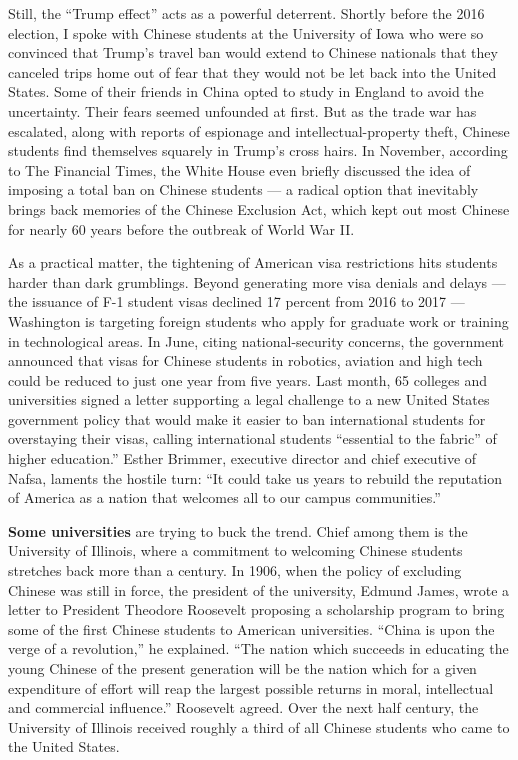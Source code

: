 Still, the ``Trump effect'' acts as a powerful deterrent. Shortly before
the 2016 election, I spoke with Chinese students at the University of
Iowa who were so convinced that Trump's travel ban would extend to
Chinese nationals that they canceled trips home out of fear that they
would not be let back into the United States. Some of their friends in
China opted to study in England to avoid the uncertainty. Their fears
seemed unfounded at first. But as the trade war has escalated, along
with reports of espionage and intellectual-property theft, Chinese
students find themselves squarely in Trump's cross hairs. In November,
according to The Financial Times, the White House even briefly discussed
the idea of imposing a total ban on Chinese students --- a radical
option that inevitably brings back memories of the Chinese Exclusion
Act, which kept out most Chinese for nearly 60 years before the outbreak
of World War II.

As a practical matter, the tightening of American visa restrictions hits
students harder than dark grumblings. Beyond generating more visa
denials and delays --- the issuance of F-1 student visas declined 17
percent from 2016 to 2017 --- Washington is targeting foreign students
who apply for graduate work or training in technological areas. In June,
citing national-security concerns, the government announced that visas
for Chinese students in robotics, aviation and high tech could be
reduced to just one year from five years. Last month, 65 colleges and
universities signed a letter supporting a legal challenge to a new
United States government policy that would make it easier to ban
international students for overstaying their visas, calling
international students ``essential to the fabric'' of higher
education.'' Esther Brimmer, executive director and chief executive of
Nafsa, laments the hostile turn: ``It could take us years to rebuild the
reputation of America as a nation that welcomes all to our campus
communities.''

\textbf{Some universities} are trying to buck the trend. Chief among
them is the University of Illinois, where a commitment to welcoming
Chinese students stretches back more than a century. In 1906, when the
policy of excluding Chinese was still in force, the president of the
university, Edmund James, wrote a letter to President Theodore Roosevelt
proposing a scholarship program to bring some of the first Chinese
students to American universities. ``China is upon the verge of a
revolution,'' he explained. ``The nation which succeeds in educating the
young Chinese of the present generation will be the nation which for a
given expenditure of effort will reap the largest possible returns in
moral, intellectual and commercial influence.'' Roosevelt agreed. Over
the next half century, the University of Illinois received roughly a
third of all Chinese students who came to the United States.

